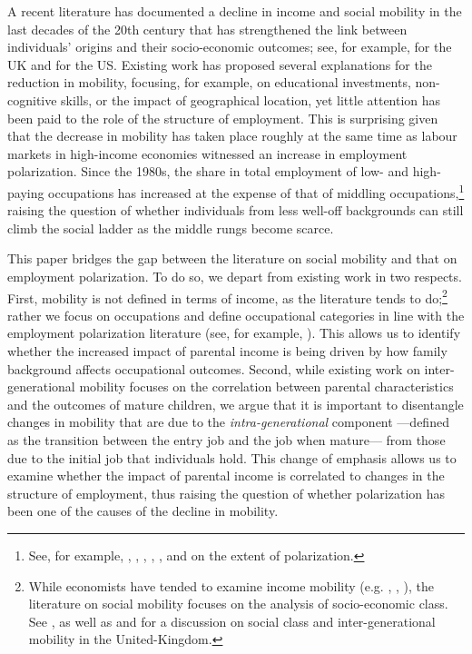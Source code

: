 A recent literature has documented a decline in income and social mobility in the last decades of the 20th century that has strengthened the link between individuals' origins and their socio-economic outcomes; see, for example, \citet{Blanden2007Accounting} for the UK and \citet{Chetty2020Race} for the US.
Existing work has proposed several explanations for the reduction in mobility, focusing, for example, on educational investments, non-cognitive skills, or the impact of geographical location, yet little attention has been paid to the role of the structure of employment. This is surprising given that the decrease in mobility has taken place roughly at the same time as labour markets in high-income economies witnessed an increase in employment polarization. Since the 1980s, the share in total employment of low- and high-paying occupations has increased at the expense of that of middling occupations,\footnote{See, for example, \citet{Autor2003Skill}, \citet{Autor2006Polarization}, \citet{Goos2007Lousy}, \citet{Dustmann2009Revisiting}, \citet{Goos2009Job}, and \citet{Cortes2016Middle} on the extent of polarization.} raising the question of whether individuals from less well-off backgrounds can still climb the social ladder as the middle rungs become scarce. 

This paper bridges the gap between the literature on social mobility and that on employment polarization. To do so, we depart from existing work in two respects. First, mobility is not defined in terms of income, as the literature tends to do;\footnote{While economists have tended to examine income mobility (e.g. \citealt{Blanden2007Accounting}, \citealt{Blanden2013Intergenerational}, \citealt{Chetty2014Land}), the literature on social mobility focuses on the analysis of socio-economic class. See \citet{Erikson1992Constant}, as well as \citet{Chan2007Class} and \citet{Erikson2010Social} for a discussion on social class and inter-generational mobility in the United-Kingdom.} rather we focus on occupations and define occupational categories in line with the employment polarization literature (see, for example, \citealt{Goos2014Explaining}). This allows us to identify whether the increased impact of parental income is being driven by how family background affects occupational outcomes. Second, while existing work on inter-generational mobility focuses on the correlation between parental characteristics and the outcomes of mature children, we argue that it is important to disentangle changes in mobility that are due to the \textit{intra-generational} component ---defined as the transition between the entry job and the job when mature--- from those due to the initial job that individuals hold. This change of emphasis allows us to examine whether the impact of parental income is correlated to changes in the structure of employment, thus raising the question of whether polarization has been one of the causes of the decline in mobility. 

